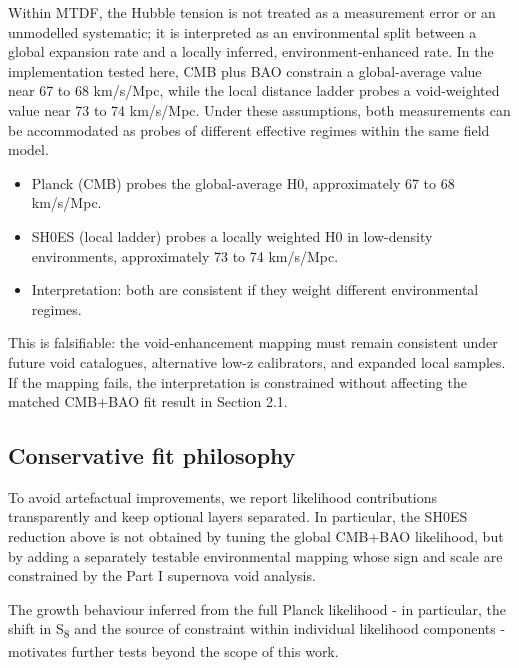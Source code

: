 \documentclass[11pt,a4paper]{article}
\begin{document}
Within MTDF, the Hubble tension is not treated as a measurement error or an unmodelled systematic; it is interpreted as an environmental split between a global expansion rate and a locally inferred, environment-enhanced rate. In the implementation tested here, CMB plus BAO constrain a global-average value near 67 to 68 km/\allowbreak{}s/\allowbreak{}Mpc, while the local distance ladder probes a void-weighted value near 73 to 74 km/\allowbreak{}s/\allowbreak{}Mpc. Under these assumptions, both measurements can be accommodated as probes of different effective regimes within the same field model.

\begin{itemize}
  \item Planck (CMB) probes the global-average H0, approximately 67 to 68 km/\allowbreak{}s/\allowbreak{}Mpc.
  \item SH0ES (local ladder) probes a locally weighted H0 in low-density environments, approximately 73 to 74 km/\allowbreak{}s/\allowbreak{}Mpc.
  \item Interpretation: both are consistent if they weight different environmental regimes.
\end{itemize}

This is falsifiable: the void-enhancement mapping must remain consistent under future void catalogues, alternative low-z calibrators, and expanded local samples. If the mapping fails, the interpretation is constrained without affecting the matched CMB+BAO fit result in Section 2.1.

\subsection{Conservative fit philosophy}
To avoid artefactual improvements, we report likelihood contributions transparently and keep optional layers separated. In particular, the SH0ES reduction above is not obtained by tuning the global CMB+BAO likelihood, but by adding a separately testable environmental mapping whose sign and scale are constrained by the Part I supernova void analysis.

The growth behaviour inferred from the full Planck likelihood  -  in particular, the shift in S\textsubscript{8} and the source of constraint within individual likelihood components  -  motivates further tests beyond the scope of this work.
\end{document}
